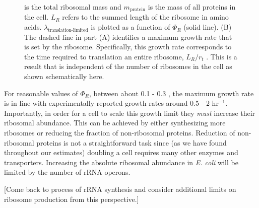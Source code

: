 \begin{figure}
\begin{fullwidth}
{{            is the total ribosomal mass and $m_{\textrm{protein}}$ is the mass
            of all proteins in the cell. $L_R$ refers to the summed length of
            the ribosome in amino acids.
            $\lambda_{\textrm{translation-limited}}$ is plotted as a function of
            $\Phi_R$ (solid line). (B) The dashed line in part (A) identifies a
            maximum growth rate that is set by the ribosome. Specifically, this
            growth rate corresponds to the time required to  translation an
            entire ribosome, $L_R/ r_t$ . This is a result that is independent
            of the number of ribosomes in the cell as shown schematically here.
            }
        \label{fig:ribosome_limit}
        }
  \end{fullwidth}
\end{figure}

For reasonable values of $\Phi_R$, between about 0.1 - 0.3 \citep{scott2010},
the maximum growth rate is in line with experimentally reported growth rates
around 0.5 - 2 hr$^{-1}$.
Importantly, in order for a cell to scale this growth
limit they \textit{must} increase their ribosomal abundance.
This can be achieved by either synthesizing more ribosomes or reducing the
fraction of non-ribosomal proteins. Reduction of non-ribosomal proteins is not
a straightforward task since (as we have found throughout our estimates) doubling a
cell requires many other enzymes and transporters. Increasing the absolute
ribosomal abundance in \textit{E. coli} will be limited by the number of
rRNA operons.

[Come back to process of rRNA synthesis and consider additional limits on ribosome production from this perspective.]
